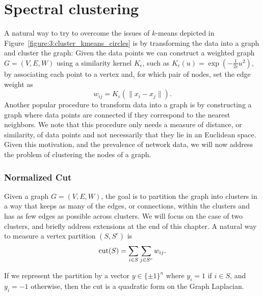 \section{Spectral clustering}

A natural way to try to overcome the issues of $k$-means depicted in Figure~\ref{figure:3:cluster_kmeans_circles} is by transforming the data into a graph and cluster the graph: Given the data points we can construct a weighted graph $G = (V,E,W)$ using a similarity kernel $K_{\epsilon}$, such as $K_{\epsilon}(u) = \exp\left(-\frac1{2\epsilon}u^2\right)$, by associating each point to a vertex and, for which pair of nodes, set the edge weight as
\[
w_{ij} = K_{\epsilon}\left( \|x_i-x_j\| \right).
\]
Another popular procedure to transform data into a graph is by constructing a graph where data points are connected if they correspond to the nearest neighbors. We note that this procedure only needs a measure of distance, or similarity, of data points and not necessarily that they lie in an Euclidean space. Given this motivation, and the prevalence of network data, we will now address the problem of clustering the nodes of a graph.




\subsubsection*{Normalized Cut}

Given a graph $G=(V,E,W)$, the goal is to partition the graph into clusters in a way that keeps as many of the edges, or connections, within the clusters and has as few edges as possible across clusters. We will focus on the case of two clusters, and briefly address extensions at the end of this chapter. A natural way to measure a vertex partition $\left(S,S^c\right)$ is
\[
\operatorname{cut}(S) = \sum_{i\in S}\sum_{j\in S^c} w_{ij}.
\]

If we represent the partition by a vector $y\in\{\pm 1\}^n$ where $y_i=1$ if $i\in S$, and $y_i=-1$ otherwise, then the cut is a quadratic form on the Graph Laplacian.


